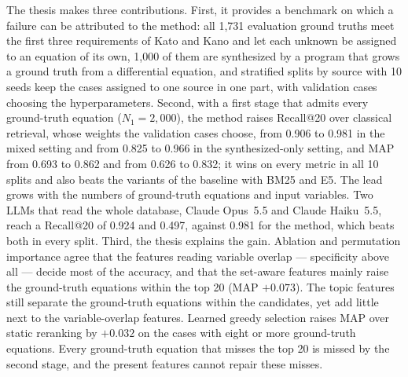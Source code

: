 The thesis makes three contributions. First, it provides a benchmark on which a failure can be
attributed to the method: all 1,731 evaluation ground truths meet the first three requirements of
Kato and Kano and let each unknown be assigned to an equation of its own, 1,000 of them are
synthesized by a program that grows a ground truth from a differential equation, and stratified
splits by source with 10 seeds keep the cases assigned to one source in one part, with validation
cases choosing the hyperparameters. Second, with a first stage that admits every ground-truth equation
($N_1 = 2{,}000$), the method raises Recall@20 over classical retrieval, whose weights the
validation cases choose, from 0.906 to 0.981 in the mixed setting and from 0.825 to 0.966 in the
synthesized-only setting, and MAP from 0.693 to 0.862 and from 0.626 to 0.832; it wins on every
metric in all 10 splits and also beats the variants of the baseline with BM25 and E5. The lead grows
with the numbers of ground-truth equations and input variables. Two LLMs that read the whole
database, Claude Opus~5.5 and Claude Haiku~5.5, reach a Recall@20 of 0.924 and 0.497, against 0.981
for the method, which beats both in every split. Third, the thesis explains the
gain. Ablation and permutation importance agree that the features reading variable overlap ---
specificity above all --- decide most of the accuracy, and that the set-aware features mainly raise
the ground-truth equations within the top 20 (MAP $+0.073$). The topic features still separate the
ground-truth equations within the candidates, yet add little next to the variable-overlap features.
Learned greedy selection raises MAP over static reranking by $+0.032$ on the cases with eight or
more ground-truth equations. Every ground-truth equation that misses the top 20 is missed by the second stage, and
the present features cannot repair these misses.

